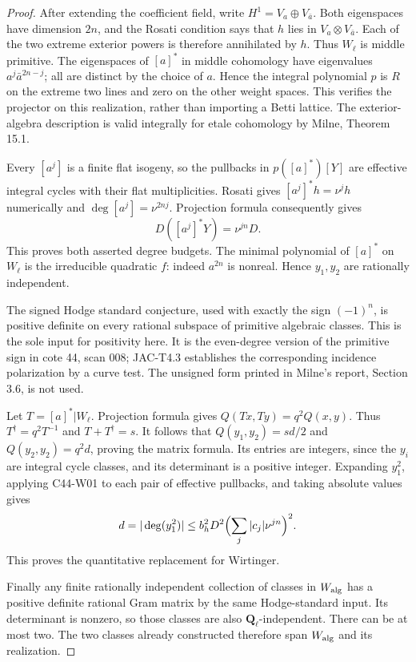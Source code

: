 \begin{proof}
After extending the coefficient field, write $H^1=V_a\oplus V_{\bar a}$.
Both eigenspaces have dimension $2n$, and the Rosati condition says
that $h$ lies in $V_a\otimes V_{\bar a}$.  Each of the two extreme
exterior powers is therefore annihilated by $h$.  Thus $W_\ell$ is
middle primitive.  The eigenspaces of $[a]^*$ in middle cohomology
have eigenvalues $a^j\bar a^{2n-j}$; all are distinct by the choice
of $a$.  Hence the integral polynomial $p$ is $R$ on the extreme
two lines and zero on the other weight spaces.  This verifies the
projector on this realization, rather than importing a Betti lattice.
The exterior-algebra description is valid integrally for etale
cohomology by Milne, Theorem 15.1.

Every $[a^j]$ is a finite flat isogeny, so the pullbacks in
$p([a]^*)[Y]$ are effective integral cycles with their flat
multiplicities.  Rosati gives $[a^j]^*h=\nu^jh$ numerically and
$\deg[a^j]=\nu^{2nj}$.  Projection formula consequently gives
\[
 D([a^j]^*Y)=\nu^{jn}D.
\]
This proves both asserted degree budgets.  The minimal polynomial
of $[a]^*$ on $W_\ell$ is the irreducible quadratic $f$: indeed
$a^{2n}$ is nonreal.  Hence $y_1,y_2$ are rationally independent.

The signed Hodge standard conjecture, used with exactly the sign
$(-1)^n$, is positive definite on every rational subspace of
primitive algebraic classes.  This is the sole input for positivity
here.  It is the even-degree version of the primitive sign in
cote 44, scan 008; JAC-T4.3 establishes the corresponding incidence
polarization by a curve test.  The unsigned form printed in
Milne's report, Section 3.6, is not used.

Let $T=[a]^*|W_\ell$.  Projection formula gives
$Q(Tx,Ty)=q^2Q(x,y)$.  Thus $T^\dagger=q^2T^{-1}$ and
$T+T^\dagger=s$.  It follows that
$Q(y_1,y_2)=sd/2$ and $Q(y_2,y_2)=q^2d$, proving the matrix
formula.  Its entries are integers, since the $y_i$ are integral
cycle classes, and its determinant is a positive integer.
Expanding $y_1^2$, applying C44-W01 to each pair of effective
pullbacks, and taking absolute values gives
\[
 d=|\deg(y_1^2)|
 \leq b_h^2D^2\Bigl(\sum_j|c_j|\nu^{jn}\Bigr)^2.
\]
This proves the quantitative replacement for Wirtinger.

Finally any finite rationally independent collection of classes in
$W_{\rm alg}$ has a positive definite rational Gram matrix by the
same Hodge-standard input.  Its determinant is nonzero, so those
classes are also $\mathbf Q_\ell$-independent.  There can be at most
two.  The two classes already constructed therefore span
$W_{\rm alg}$ and its realization.
\end{proof}


